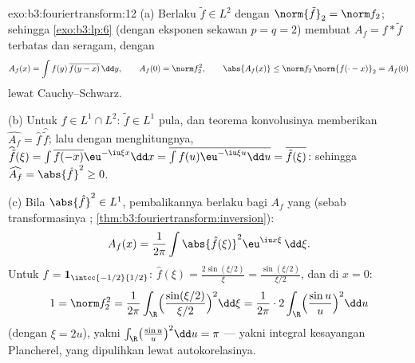 \begin{solution}{exo:b3:fouriertransform:12}
(a) Berlaku $\tilde f \in L^2$ dengan $\norm{\tilde f}_2 = \norm f_2$;
sehingga \cref{exo:b3:lp:6} (dengan eksponen sekawan $p = q = 2$) membuat
$A_f = f * \tilde f$ terbatas dan  seragam, dengan
\[
A_f(x) = \int f(y)\,\overline{f(y - x)}\,\dd y,
\qquad A_f(0) = \norm f_2^2,
\qquad \abs{A_f(x)} \leq \norm f_2\,\norm{f(\cdot -
x)}_2 = A_f(0)
\]
lewat Cauchy--Schwarz.

(b) Untuk $f \in L^1\cap L^2$: $\tilde f \in L^1$ pula, dan
teorema konvolusinya memberikan $\widehat{A_f} = \hat f\,
\widehat{\tilde f}$; lalu dengan menghitungnya, $\widehat{\tilde f}(\xi) =
\int\overline{f(-x)}\eu^{-\iu\xi x}\dd x =
\overline{\int f(u)\eu^{-\iu\xi u}\dd u} =
\overline{\hat f(\xi)}$: sehingga $\widehat{A_f} = \abs{\hat f}^2
\geq 0$.

(c) Bila $\abs{\hat f}^2 \in L^1$, pembalikannya berlaku bagi
$A_f$ yang  (sebab transformasinya ;
\cref{thm:b3:fouriertransform:inversion}):
\[
A_f(x) = \frac1{2\pi}\int\abs{\hat f(\xi)}^2
\eu^{\iu x\xi}\,\dd\xi .
\]
Untuk $f = \mathbf 1_{\intcc{-1/2}{1/2}}$: $\hat f(\xi) =
\frac{2\sin(\xi/2)}\xi = \frac{\sin(\xi/2)}{\xi/2}$, dan di
$x = 0$:
\[
1 = \norm f_2^2 = \frac1{2\pi}\int_\R
\Bigl(\frac{\sin(\xi/2)}{\xi/2}\Bigr)^2\dd\xi
= \frac1{2\pi}\cdot2\int_\R\Bigl(\frac{\sin u}u\Bigr)^2\dd u
\]
(dengan $\xi = 2u$), yakni $\int_\R\bigl(\frac{\sin u}u\bigr)^2\dd
u = \pi$ --- yakni integral kesayangan Plancherel, yang dipulihkan lewat
autokorelasinya.
\end{solution}

